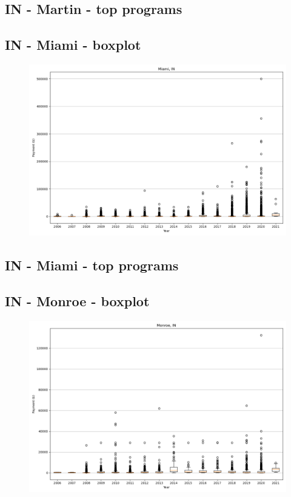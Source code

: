 \subsection*{IN - Martin - top programs}

\newpage
\subsection*{IN - Miami - boxplot}
\begin{figure}[h]
\centering
\includegraphics[width=7in]{../output/boxplots/counties/Miami-IN_boxplot.png}
\end{figure}


\subsection*{IN - Miami - top programs}

\newpage
\subsection*{IN - Monroe - boxplot}
\begin{figure}[h]
\centering
\includegraphics[width=7in]{../output/boxplots/counties/Monroe-IN_boxplot.png}
\end{figure}


